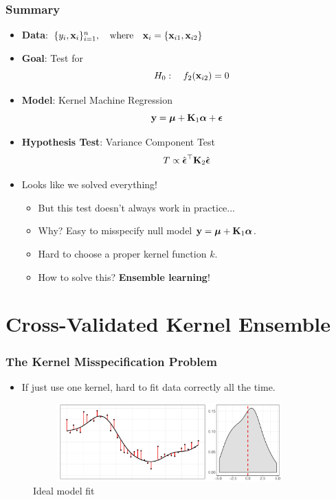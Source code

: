 \documentclass{beamer}
\begin{document}
\begin{frame}
\frametitle{Summary}
\begin{itemize}
\item \textbf{Data}: 
$\{ y_i, {\bf x}_i \}_{i=1}^n, \quad \mbox{where} \quad 
{\bf x}_i= \{{\bf x}_{i1}, {\bf x}_{i2}\}$
\item \textbf{Goal}: Test for $$\quad H_0: \quad f_2({\bf x}_{i2}) = 0$$
\item \textbf{Model}: Kernel Machine Regression
$${\bf y} =\boldsymbol{\mu} + {\bf K}_1\boldsymbol{\alpha} +\boldsymbol{\epsilon}$$
\item \textbf{Hypothesis Test}: Variance Component Test
$$ T \propto \hat{\boldsymbol{\epsilon}}^\top {\bf K}_2 \hat{\boldsymbol{\epsilon}}$$
\item Looks like we solved everything! 
\begin{itemize}[<+->]
\item But this test doesn't always work in practice...
\item Why? Easy to misspecify null model ${\bf y} =\boldsymbol{\mu} + {\bf K}_1\boldsymbol{\alpha}$.
\item Hard to choose a proper kernel function $k$.
\item How to solve this? {\color{red} \textbf{Ensemble learning}!}
\end{itemize}
\end{itemize}
\end{frame}

\section{Cross-Validated Kernel Ensemble} 
\begin{frame}
\frametitle{The Kernel Misspecification Problem}
\begin{itemize}
\item If just use one kernel, hard to fit data correctly all the time.
\end{itemize}

\begin{figure}
\includegraphics[height=3cm, width=10.5cm]{./plot/raw_final} 
\caption{Ideal model fit}
\end{figure}

\end{frame}
\end{document}
